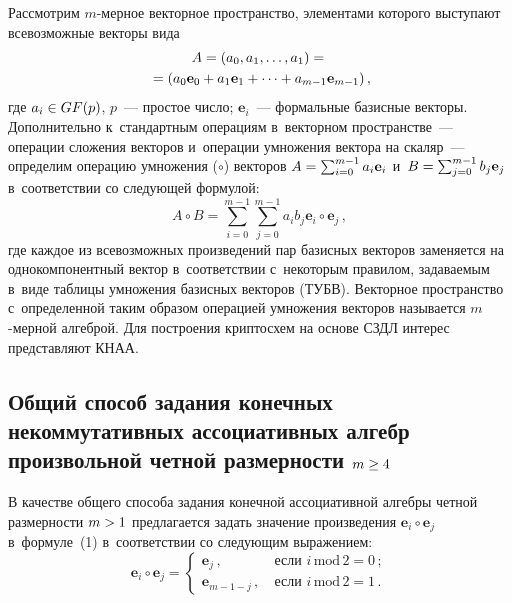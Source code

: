 \begin{multicols}{2}
  Рассмотрим $m$-мер\-ное векторное пространство, элементами которого 
выступают всевозможные векторы вида
  \begin{multline*}
  A= \left(a_0, a_1, \ldots , a_1\right)= {}\\
  {}=\left(a_0\mathbf{e}_0\hm+ 
a_1\mathbf{e}_1+\cdots + a_{m-1}\mathbf{e}_{m-1}\right),
\end{multline*}
 где $a_i\hm\in GF(p)$, 
$p$~--- простое число; $\mathbf{e}_i$~--- формальные базисные векторы. 
Дополнительно к~стандартным операциям в~векторном пространстве~--- 
операции сложения векторов и~операции умножения вектора на скаляр~--- 
определим операцию умножения ($\circ$) векторов $A\hm= 
\sum\nolimits_{i=0}^{m-1} a_i\mathbf{e}_i$ и~$B\hm= 
  \sum\nolimits_{j=0}^{m-1} b_j\mathbf{e}_j$ в~соответствии со следующей 
формулой:  
  \begin{equation}
  A\circ B= \sum\limits_{i=0}^{m-1} \sum\limits_{j=0}^{m-1} a_i b_j 
\mathbf{e}_i\circ \mathbf{e}_j\,,
  \label{e1-f}
  \end{equation}
где каждое из всевозможных произведений пар базисных векторов заменяется 
на однокомпонентный вектор в~соответствии с~некоторым правилом, 
задаваемым в~виде таблицы умножения базисных векторов (ТУБВ). Векторное 
пространство с~определенной таким образом операцией умножения векторов 
называется $m$-мер\-ной алгеброй. Для построения криптосхем на основе 
СЗДЛ интерес представляют КНАА.

\subsection{Общий способ задания конечных некоммутативных ассоциативных
алгебр произвольной четной 
размерности $m\hm\geq4$}

  В качестве общего способа задания конечной ассоциативной алгебры четной 
размерности $m\hm>1$ предлагается задать значение произведения 
$\mathbf{e}_i\circ \mathbf{e}_j$ в~формуле~(1) в~соответствии со следующим 
выражением:
  \begin{equation}
  \mathbf{e}_i\circ\mathbf{e}_j=\begin{cases}
  \mathbf{e}_j\,, &\ \mbox{если } i\,\mathrm{mod}\,2=0\,;\\
  \mathbf{e}_{m-1-j}\,, &\ \mbox{если } i\,\mathrm{mod}\,2=1\,.
  \end{cases}
  \label{e2-f}
  \end{equation}
  

\end{multicols}
